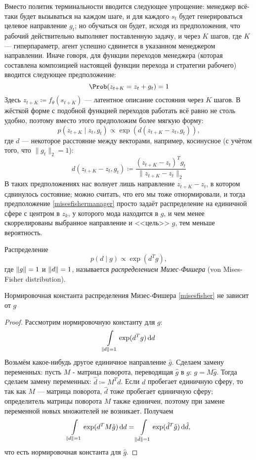 Вместо политик терминальности вводится следующее упрощение: менеджер всё-таки будет вызываться на каждом шаге, и для каждого $s_t$ будет генерироваться целевое направление $g_t$; но обучаться он будет, исходя из предположения, что рабочий действительно выполняет поставленную задачу, и через $K$ шагов, где $K$ --- гиперпараметр, агент успешно сдвинется в указанном менеджером направлении. Иначе говоря, для функции переходов менеджера (которая составлена композицией настоящей функции перехода и стратегии рабочего) вводится следующее предположение:
$$\Prob (z_{t + K} = z_t + g_t) = 1$$
Здесь $z_{t+K} \coloneqq f_{\theta}(s_{t+K})$ --- латентное описание состояния через $K$ шагов. В жёсткой форме с подобной функцией переходов работать всё равно не столь удобно, поэтому вместо этого предположим более мягкую форму:
\begin{equation}\label{misesfishermanager}
    p(z_{t + K} \mid z_t, g_t) \propto \exp(d(z_{t+K} - z_t, g_t)),
\end{equation}
где $d$ --- некоторое расстояние между векторами, например, косинусное (с учётом того, что $\|g_t\|_2 = 1$):
$$d(z_{t+K} - z_t, g_t) \coloneqq \frac{(z_{t+K} - z_t)^Tg_t}{\|z_{t + K} - z_t\|_2}$$
В таких предположениях нас волнует лишь направление $z_{t + K} - z_t$, в котором сдвинулось состояние; можно считать, что его мы тоже отнормировали, и тогда предположение \eqref{misesfishermanager} просто задаёт распределение на единичной сфере с центром в $z_k$, у которого мода находится в $g$, и чем менее скоррелированы выбранное направление и <<цель>> $g$, тем меньше вероятность.
\begin{definition}
Распределение 
\begin{equation}\label{misesfisher}
   p(d \mid g) \propto \exp(d^Tg),
\end{equation}
где $\|g\| \HM= 1$ и $\|d\| \HM= 1$, называется \emph{распределением Мизес-Фишера} (von Mises-Fisher distribution).
\end{definition}


\begin{proposition}
Нормировочная константа распределения Мизес-Фишера \eqref{misesfisher} не зависит от $g$
\begin{proof} Рассмотрим нормировочную константу для $g$:
$$\int\limits_{\|d\| = 1} \exp(d^Tg) \mathop{}\!\mathrm{d} d$$
Возьмём какое-нибудь другое единичное направление $\hat{g}$. Сделаем замену переменных: пусть $M$ - матрица поворота, переводящая $\hat{g}$ в $g$: $g = M \hat{g}$. Тогда сделаем замену переменных: $\hat{d} \coloneqq M^T d$. Если $d$ пробегает единичную сферу, то так как $M$ --- матрица поворота, $\hat{d}$ тоже пробегает единичную сферу; определитель матрицы поворота $M$ также единичен, поэтому при замене переменной новых множителей не возникает. Получаем
$$\int\limits_{\|d\| = 1} \exp(d^TM\hat{g}) \mathop{}\!\mathrm{d} d = \int\limits_{\|\hat{d}\| = 1} \exp(\hat{d}^T\hat{g}) \mathop{}\!\mathrm{d} \hat{d},$$
что есть нормировочная константа для $\hat{g}$.
\end{proof}
\end{proposition}

